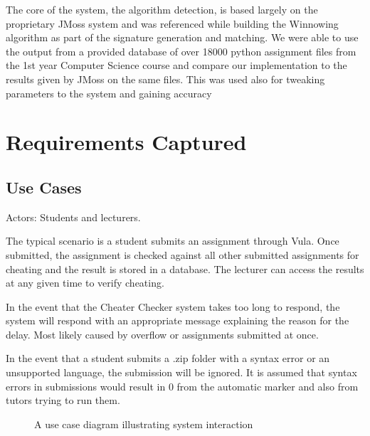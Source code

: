 \documentclass[11pt,a4paper]{article}
\begin{document}
The core of the system, the algorithm detection, is based largely on the proprietary
JMoss system and was referenced while building the Winnowing algorithm as part of the
signature generation and matching. We were able to use the output from a provided database of over 18000 python assignment files from the 1st year Computer Science course and compare our implementation to the results given by JMoss on the same files. This was used also for tweaking parameters to the system and gaining accuracy

\section{Requirements Captured}

\subsection{Use Cases}

Actors: Students and lecturers.

The typical scenario is a student submits an assignment through Vula. Once submitted, the assignment is checked against all other submitted assignments for cheating and the result is stored in a database. The lecturer can access the results at any given time to verify cheating.

In the event that the Cheater Checker system takes too long to respond, the system will respond with an appropriate message explaining the reason for the delay. Most likely caused by overflow or assignments submitted at once. 

In the event that a student submits a .zip folder with a syntax error or an unsupported language, the submission will be ignored. It is assumed that syntax errors in submissions would result in 0 from the automatic marker and also from tutors trying to run them.

\begin{figure}[h!]
  \caption{A use case diagram illustrating system interaction}
  \label{fig:usecase}
\end{figure}
\end{document}
